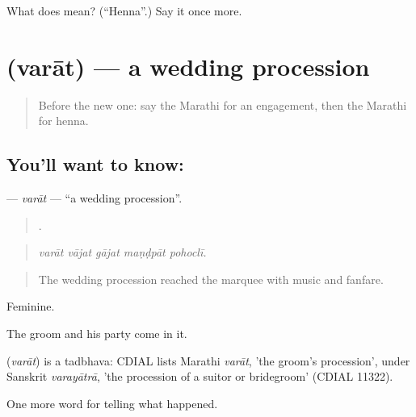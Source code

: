 \begin{tcolorbox}[breakable,colback=teal!4,colframe=teal!35!black,title={Before you move on}]
What does  mean? (\textquotedblleft{}Henna\textquotedblright{}.) Say it once more.
\end{tcolorbox}
\section[\texorpdfstring{\mr{वरात} (varāt)}{वरात (varāt)}]{ (varāt) — a wedding procession}

\label{lesson:MR-C316-varat}



\begin{quote}
Before the new one: say the Marathi for an engagement, then the Marathi for henna.
\end{quote}

\subsection*{You'll want to know: }
\textbf{} — \emph{varāt} — \textquotedblleft{}a wedding procession\textquotedblright{}.

\begin{quote}
    .
\end{quote}

\begin{quote}
\emph{varāt vājat gājat maṇḍpāt pohoclī.}
\end{quote}

\begin{quote}
The wedding procession reached the marquee with music and fanfare.
\end{quote}

Feminine.

The groom and his party come in it.

\begin{cousinweb}
\textbf{} (\emph{varāt}) is a tadbhava: CDIAL lists Marathi \emph{varāt}, 'the groom's procession', under Sanskrit \emph{varayātrā}, 'the procession of a suitor or bridegroom' (CDIAL 11322).
\end{cousinweb}

\begin{grammarlens}[title={What you've built}]
One more word for telling what happened.
\end{grammarlens}

